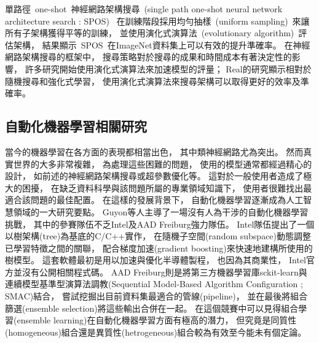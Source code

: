 \documentclass[a4paper,12pt]{extarticle}
\begin{document}
            單路徑~one-shot~神經網路架構搜尋~(single path one-shot neural network architecture search : SPOS)~\cite{guo2020single}
            在訓練階段採用均勻抽樣~(uniform sampling)~來讓所有子架構獲得平等的訓練，
            並使用演化式演算法~(evolutionary algorithm)~評估架構，
            結果顯示~SPOS~在ImageNet資料集上可以有效的提升準確率。
            在神經網路架構搜尋的框架中，
            搜尋策略對於搜尋的成果和時間成本有著決定性的影響，
            許多研究開始使用演化式演算法來加速模型的評量\cite{6791438}；
            Real\cite{real2019regularized}的研究顯示相對於隨機搜尋和強化式學習，
            使用演化式演算法來搜尋架構可以取得更好的效率及準確率。

        \subsection{自動化機器學習相關研究}
            當今的機器學習在各方面的表現都相當出色，
            其中類神經網路尤為突出。
            然而真實世界的大多非常複雜，
            為處理這些困難的問題，
            使用的模型通常都經過精心的設計，
            如前述的神經網路架構搜尋或超參數優化等。
            這對於一般使用者造成了極大的困擾，
            在缺乏資料科學與該問題所屬的專業領域知識下，
            使用者很難找出最適合該問題的最佳配置。
            在這樣的發展背景下，
            自動化機器學習逐漸成為人工智慧領域的一大研究要點。
            Guyon等人\cite{pmlr-v64-guyon_review_2016}主導了一場沒有人為干涉的自動化機器學習挑戰，
            其中的參賽隊伍不乏Intel及AAD Freiburg強力隊伍。
            Intel隊伍提出了一個以樹架構(tree)為基底的C/C++實作，
            在隨機子空間(random subspace)動態調整已學習特徵之間的關聯，
            配合梯度加速(gradient boosting)來快速地建構所使用的樹模型。
            這套軟體最初是用以加速與優化半導體製程，
            也因為其商業性，
            Intel官方並沒有公開相關程式碼。
            AAD Freiburg則是將第三方機器學習庫sckit-learn與連續模型基準型演算法調教(Sequential Model-Based Algorithm Configuration ; SMAC)結合，
            嘗試挖掘出目前資料集最適合的管線(pipeline)，
            並在最後將組合篩選(ensemble selection)將這些輸出合併在一起。
            在這個競賽中可以見得組合學習(ensemble learning)在自動化機器學習方面有極高的潛力，
            但究竟是同質性(homogeneous)組合還是異質性(hetrogeneous)組合較為有效至今能未有個定論。
\end{document}
